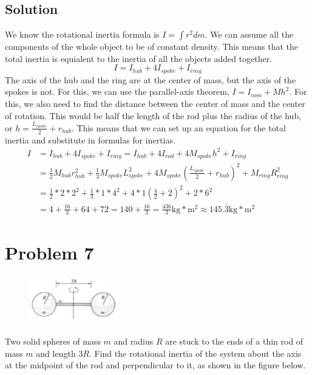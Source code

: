 \documentclass[12pt]{article}
\begin{document}
\subsection*{Solution}
We know the rotational inertia formula is \(I = \int r^2 dm\). We can assume all the components of the whole object to be of constant density. This means that the total inertia is equialent to the inertia of all the objects added together.
\[ I = I_{hub} + 4 I_{spoke} + I_{ring} \]
The axis of the hub and the ring are at the center of mass, but the axis of the spokes is not. For this, we can use the parallel-axis theorem, \(I = I_{com} + Mh^2\). For this, we also need to find the distance between the center of mass and the center of rotation. This would be half the length of the rod plus the radius of the hub, or \(h = \frac{L_{spoke}}{2} + r_{hub}\). This means that we can set up an equation for the total inertia and substitute in formulas for inertias.
\begin{align*}
    I   &=  I_{hub} + 4 I_{spoke} + I_{ring}
        =   I_{hub} + 4 I_{rod} + 4M_{spoke}h^2 + I_{ring}\\
        &=  \frac{1}{2}M_{hub}r_{hub}^2 + \frac{1}{3}M_{spoke}L_{spoke}^2 + 4M_{spoke}\left(\frac{L_{spoke}}{2} + r_{hub}\right)^2 + M_{ring}R_{ring}^2\\
        &=  \frac{1}{2}*2*2^2 + \frac{1}{3}*1*4^2 + 4*1\left(\frac{4}{2} + 2\right)^2 + 2*6^2\\
        &=  4 + \frac{16}{3} + 64 + 72
        =   140+\frac{16}{3}
        =   \boxed{\frac{436}{3} \unit{\kilo\gram*\meter^2} \approx 145.\bar{3} \unit{\kilo\gram*\meter^2}}
\end{align*}


\pagebreak
\section*{Problem 7}
\begin{figure}
    \vspace{-30pt}
    \includegraphics[width=0.35\textwidth]{graph_7.png} 
\end{figure}
Two solid spheres of mass $m$ and radius $R$ are stuck to the ends of a thin rod of mass $m$ and
length $3R$. Find the rotational inertia of the system about the axis at the midpoint of the rod and
perpendicular to it, as shown in the figure below.
\end{document}
